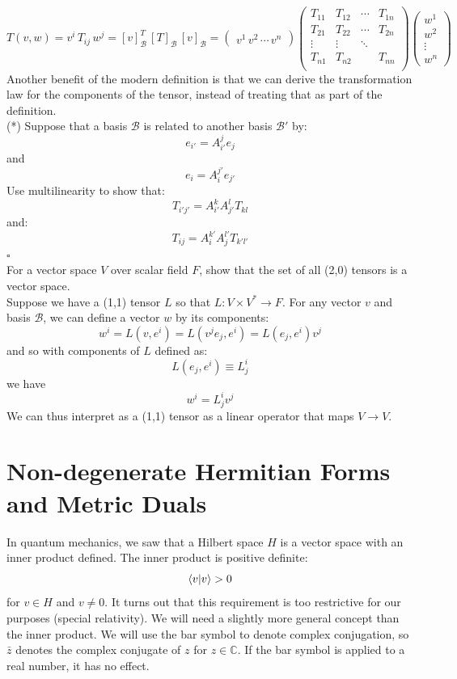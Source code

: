\documentclass[12pt]{article}
\begin{document}
\begin{displaymath}
T(v,w) = v^i \, T_{ij} \, w^j = [v]_\mathcal{B}^T \, [T]_\mathcal{B} \, [v]_\mathcal{B} = \begin{pmatrix} v^1 \, v^2 \, \cdots \, v^n \end{pmatrix}
\begin{pmatrix}
  T_{11} & T_{12} & \cdots & T_{1n} \\
  T_{21} & T_{22} & \cdots & T_{2n} \\
  \vdots & \vdots & \ddots &        \\
  T_{n1} & T_{n2} &        & T_{nn} \\ \end{pmatrix}
\begin{pmatrix} w^1 \\ w^2 \\ \vdots \\ w^n \end{pmatrix}
\end{displaymath}
Another benefit of the modern definition is that we can derive the transformation law for the components of the tensor, instead of treating that as part of the definition.\\[3pt]

\exercise (*)
Suppose that a basis $\mathcal{B}$ is related to another basis $\mathcal{B}'$ by:
$$e_{i'} = A^{j}_{i'} e_{j}$$
and
$$e_{i} = A^{j'}_{i} e_{j'}$$
Use multilinearity to show that:
$$T_{i'j'} = A_{i'}^k A_{j'}^l T_{kl}$$
and:
$$T_{ij} = A_i^{k'} A_j^{l'} T_{k'l'} $$
 $\square$ \\[3pt]

\exercise
For a vector space $V$ over scalar field $F$, show that the set of all (2,0) tensors is a vector space.\\[3pt]

\noindent
Suppose we have a (1,1) tensor $L$ so that $L:V \times V^* \to F$.  For any vector $v$ and basis $\mathcal{B}$, we can define a vector $w$ by its components:
$$w^i = L(v,e^i) = L(v^j e_j, e^i) = L(e_j, e^i) v^j$$
and so with components of $L$ defined as:
$$L(e_j, e^i) \equiv L_j^i$$
we have
$$w^i = L^i_j v^j$$
We can thus interpret as a (1,1) tensor as a linear operator that maps $V \to V$.

\section{Non-degenerate Hermitian Forms and Metric Duals}
\label{sec:metricdual}

In quantum mechanics, we saw that a Hilbert space $H$ is a vector
space with an inner product defined.  The inner product is positive
definite:
$$\braket{v|v} > 0$$
for $v \in H$ and $v \neq 0$.  It turns out that this requirement is
too restrictive for our purposes (special relativity).  We will need a
slightly more general concept than the inner product.  We will use the
bar symbol to denote complex conjugation, so $\bar{z}$ denotes the
complex conjugate of $z$ for $z \in \mathbb{C}$.  If the bar symbol is
applied to a real number, it has no effect.
\end{document}
